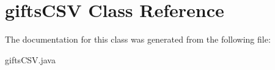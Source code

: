 \hypertarget{classgifts_c_s_v}{}\section{gifts\+C\+SV Class Reference}
\label{classgifts_c_s_v}


The documentation for this class was generated from the following file\+:\begin{DoxyCompactItemize}
\item 
gifts\+C\+S\+V.\+java\end{DoxyCompactItemize}
